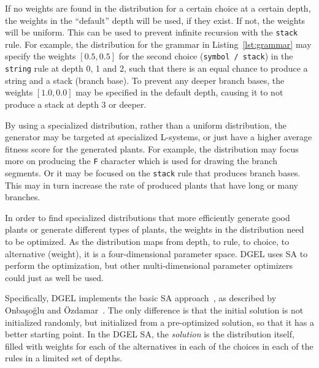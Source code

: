 If no weights are found in the distribution for a certain choice at a certain depth, the weights in the ``default'' depth will be used, if they exist.
If not, the weights will be uniform.
This can be used to prevent infinite recursion with the \texttt{stack} rule.
For example, the distribution for the grammar in Listing~\ref{lst:grammar} may specify the weights $[0.5, 0.5]$ for the second choice (\texttt{symbol / stack}) in the \texttt{string} rule at depth 0, 1 and 2, such that there is an equal chance to produce a string and a stack (\gls{branch base}).
To prevent any deeper \glspl{branch base}, the weights $[1.0, 0.0]$ may be specified in the default depth, causing it to not produce a stack at depth 3 or deeper.

By using a specialized distribution, rather than a uniform distribution, the generator may be targeted at specialized \glspl{L-system}, or just have a higher average fitness score for the generated plants.
For example, the distribution may focus more on producing the \texttt{F} character which is used for drawing the \glspl{branch segment}.
Or it may be focused on the \texttt{stack} rule that produces \glspl{branch base}.
This may in turn increase the rate of produced plants that have long or many branches.

In order to find specialized distributions that more efficiently generate good plants or generate different types of plants, the weights in the distribution need to be optimized.
As the distribution maps from depth, to rule, to choice, to alternative (weight), it is a four-dimensional parameter space.
\gls{DGEL} uses \gls{SA} to perform the optimization, but other multi-dimensional parameter optimizers could just as well be used.

Specifically, \gls{DGEL} implements the basic \gls{SA} approach~\cite{2000Ozdamar}, as described by Onbaşoğlu and Özdamar~\cite{2001Onbasoglu}.
The only difference is that the initial solution is not initialized randomly, but initialized from a pre-optimized solution, so that it has a better starting point.
In the \gls{DGEL} \gls{SA}, the \textit{solution} is the distribution itself, filled with weights for each of the alternatives in each of the choices in each of the rules in a limited set of depths.

